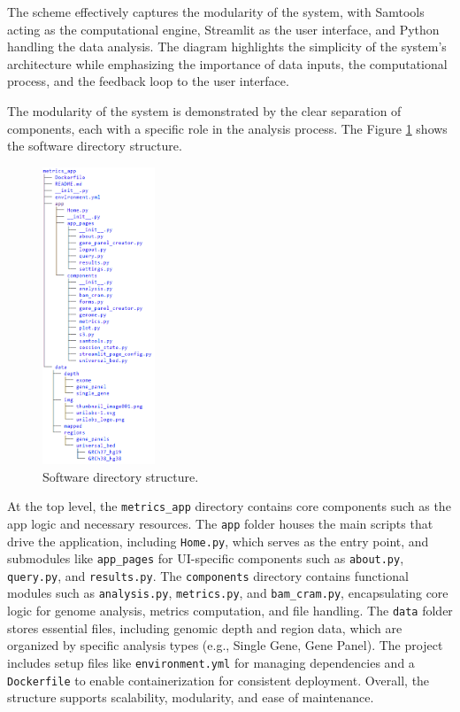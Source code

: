 The scheme effectively captures the modularity of the system, with Samtools acting as the computational engine, Streamlit as the user interface, and Python handling the data analysis. The diagram highlights the simplicity of the system's architecture while emphasizing the importance of data inputs, the computational process, and the feedback loop to the user interface.

The modularity of the system is demonstrated by the clear separation of components, each with a specific role in the analysis process. The Figure \ref{fig:tree} shows the software directory structure.

\begin{figure}[H]
    \centering
    \includegraphics[width=0.3\textwidth]{figs/tree.png}
    \caption{Software directory structure.} 
    \label{fig:tree}
\end{figure}

At the top level, the \texttt{metrics\_app} directory contains core components such as the app logic and necessary resources. The \texttt{app} folder houses the main scripts that drive the application, including \texttt{Home.py}, which serves as the entry point, and submodules like \texttt{app\_pages} for UI-specific components such as \texttt{about.py}, \texttt{query.py}, and \texttt{results.py}. The \texttt{components} directory contains functional modules such as \texttt{analysis.py}, \texttt{metrics.py}, and \texttt{bam\_cram.py}, encapsulating core logic for genome analysis, metrics computation, and file handling. The \texttt{data} folder stores essential files, including genomic depth and region data, which are organized by specific analysis types (e.g., Single Gene, Gene Panel). The project includes setup files like \texttt{environment.yml} for managing dependencies and a \texttt{Dockerfile} to enable containerization for consistent deployment. Overall, the structure supports scalability, modularity, and ease of maintenance. 

